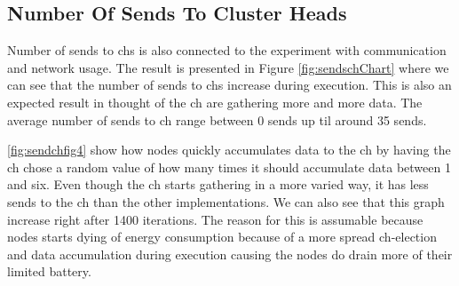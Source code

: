 \documentclass[USenglish]{uit-thesis}
\begin{document}




\newpage

\subsection{Number Of Sends To Cluster Heads}
Number of sends to \glspl{ch} is also connected to the experiment with communication and network usage. The result is presented in Figure \ref{fig:sendschChart} where we can see that the number of sends to \glspl{ch} increase during execution. This is also an expected result in thought of the \gls{ch} are gathering more and more data. The average number of sends to \gls{ch} range between $0$ sends up til around 35 sends.

\autoref{fig:sendchfig4} show how nodes quickly accumulates data to the \gls{ch} by having the \gls{ch} chose a random value of how many times it should accumulate data between 1 and six. Even though the \gls{ch} starts gathering in a more varied way, it has less sends to the \gls{ch} than the other implementations. We can also see that this graph increase right after 1400 iterations. The reason for this is assumable because nodes starts dying of energy consumption because of a more spread \gls{ch}-election and data accumulation during execution causing the nodes do drain more of their limited battery.


\end{document}
